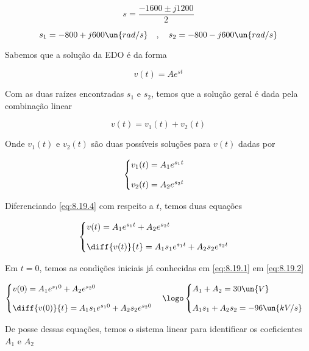 \[ s = \frac{-1600 \pm j1200}{2} \]

\[ s_1 = -800 + j600 \un{rad/s} \quad , \quad s_2 = -800 - j600 \un{rad/s} \]

Sabemos que a solução da EDO é da forma

\[ v(t) = Ae^{st}  \]

Com as duas raízes encontradas $s_1$ e $s_2$, temos que a solução geral é dada pela combinação linear

\begin{equation}\label{eq:8.19.4}
    v(t) = v_1(t) + v_2(t)
\end{equation}

Onde $v_1(t)$ e $v_2(t)$ são duas possíveis soluções para $v(t)$ dadas por  

\[ \begin{cases}
        v_1(t) = A_1e^{s_1t}  & \\
        \noalign{\vskip9pt}
        v_2(t) = A_2e^{s_2t}
    \end{cases}
\]

Diferenciando \eqref{eq:8.19.4} com respeito a $t$, temos duas equações

\[ \begin{cases}
        v(t) = A_1e^{s_1t} + A_2e^{s_2t} & \\
        \noalign{\vskip9pt}
        \diff{v(t)}{t} = A_1s_1e^{s_1t} + A_2s_2e^{s_2t}
    \end{cases}
\]

Em $t=0$, temos as condições iniciais já conhecidas em \eqref{eq:8.19.1} em \eqref{eq:8.19.2}

\[ \begin{cases}
        v(0) = A_1e^{s_10} + A_2e^{s_20} & \\
        \noalign{\vskip9pt}
        \diff{v(0)}{t} = A_1s_1e^{s_10} + A_2s_2e^{s_20}
    \end{cases}
    \logo
    \begin{cases}
        A_1 + A_2 = 30 \un{V} & \\
        \noalign{\vskip9pt}
        A_1s_1 + A_2s_2 = -96 \un{kV/s}
    \end{cases}
\]

De posse dessas equações, temos o sistema linear para identificar os coeficientes $A_1$ e $A_2$

\begingroup
\renewcommand*{\arraystretch}{1.5}

